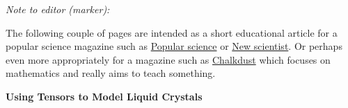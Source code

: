 \documentclass[a4paper,11pt]{article}
\begin{document}
\clearpage
{}
\begin{center}
    \begin{minipage}{.6\textwidth}
        \begin{center}
            \Large
            \emph{Note to editor (marker):}
        \end{center}
        The following couple of pages are intended as a short educational article for a popular science magazine such as \href{https://www.popsci.com/}{Popular science} or \href{https://institutions.newscientist.com/}{New scientist}. Or perhaps even more appropriately for a magazine such as \href{https://chalkdustmagazine.com/}{Chalkdust} which focuses on mathematics and really aims to teach something.
    \end{minipage}
\end{center}
\clearpage
\newpage

\begin{center}
    \Huge \textbf{Using Tensors to Model Liquid Crystals}
    \vspace{1em}
\end{center}
\end{document}
